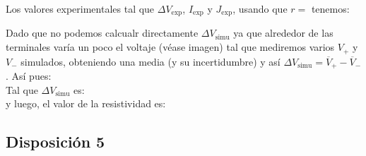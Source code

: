 \documentclass[11pt]{article}
\newcommand{\simu}{\text{simu}}
\begin{document}
Los valores experimentales tal que $\Delta V_{\exp}$, $I_{\exp}$ y $J_{\exp}$, usando que $r=$ tenemos: 



Dado que no podemos calcualr directamente $\Delta V_{\simu}$ ya que alrededor de las terminales varía un poco el voltaje (véase imagen) tal que mediremos varios $V_+$ y $V_-$ simulados, obteniendo una media (y su incertidumbre) y así $\Delta V_{\simu} = \overline{V}_+ - \overline{V}_{-} $. Así pues: \\[1em]

Tal que $\Delta V_{\simu}$ es: \\[1em]

y luego, el valor de la resistividad es:

	

\subsection{Disposición 5}
\end{document}

